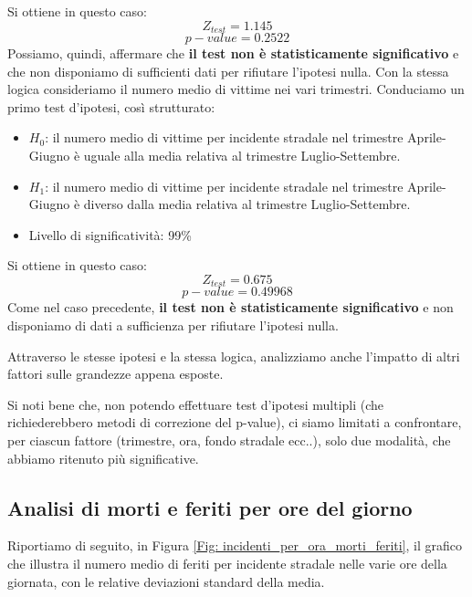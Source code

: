 \documentclass[12pt,a4paper,final,oneside]{article}			%
\begin{document}
        Si ottiene in questo caso:
        \[
            Z_{test} = 1.145
        \]
        \[
            p-value = 0.2522
        \]
        Possiamo, quindi, affermare che \textbf{il test non è statisticamente significativo} e che non disponiamo di sufficienti dati per rifiutare l’ipotesi nulla.
        \smallskip
        Con la stessa logica consideriamo il numero medio di vittime nei vari trimestri. Conduciamo un primo test d’ipotesi, così strutturato:
        \begin{itemize}
            \item $H_0$: il numero medio di vittime per incidente stradale nel trimestre Aprile-Giugno è uguale alla media relativa al trimestre Luglio-Settembre.
            \item $H_1$: il numero medio di vittime per incidente stradale nel trimestre Aprile-Giugno è diverso dalla media relativa al trimestre Luglio-Settembre.
            \item Livello di significatività: 99\%
        \end{itemize}
        Si ottiene in questo caso:
        \[
            Z_{test} = 0.675
        \]
        \[
            p-value = 0.49968
        \]
        Come nel caso precedente, \textbf{il test non è statisticamente significativo} e non disponiamo di dati a sufficienza per rifiutare l’ipotesi nulla.

        Attraverso le stesse ipotesi e la stessa logica, analizziamo anche l’impatto di altri fattori sulle grandezze appena esposte.
        
        Si noti bene che, non potendo effettuare test d’ipotesi multipli (che richiederebbero metodi di correzione del p-value), ci siamo limitati a confrontare, per ciascun fattore (trimestre, ora, fondo stradale ecc..), solo due modalità, che abbiamo ritenuto più significative. 

    \subsection{Analisi di morti e feriti per ore del giorno}
        Riportiamo di seguito, in Figura \ref{Fig: incidenti_per_ora_morti_feriti}, il grafico che illustra il numero medio di feriti per incidente stradale nelle varie ore della giornata, con le relative deviazioni standard della media. 
        
\end{document}

